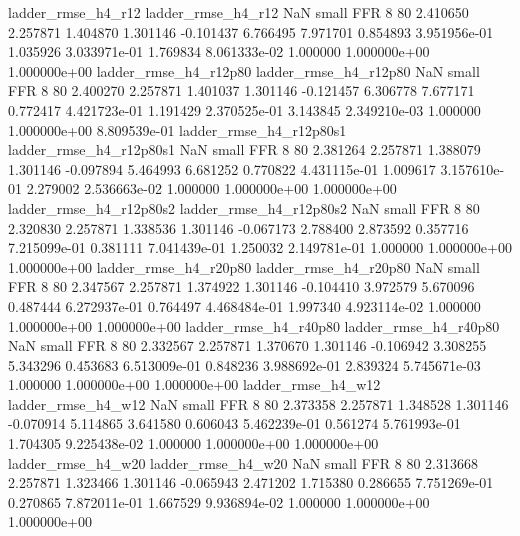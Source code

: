       ladder_rmse_h4_r12       ladder_rmse_h4_r12                   NaN      small      FFR                 8 80 2.410650       2.257871 1.404870       1.301146   -0.101437      6.766495      7.971701     0.854893   3.951956e-01  1.035926 3.033971e-01     1.769834   8.061333e-02            1.000000    1.000000e+00        1.000000e+00
   ladder_rmse_h4_r12p80    ladder_rmse_h4_r12p80                   NaN      small      FFR                 8 80 2.400270       2.257871 1.401037       1.301146   -0.121457      6.306778      7.677171     0.772417   4.421723e-01  1.191429 2.370525e-01     3.143845   2.349210e-03            1.000000    1.000000e+00        8.809539e-01
 ladder_rmse_h4_r12p80s1  ladder_rmse_h4_r12p80s1                   NaN      small      FFR                 8 80 2.381264       2.257871 1.388079       1.301146   -0.097894      5.464993      6.681252     0.770822   4.431115e-01  1.009617 3.157610e-01     2.279002   2.536663e-02            1.000000    1.000000e+00        1.000000e+00
 ladder_rmse_h4_r12p80s2  ladder_rmse_h4_r12p80s2                   NaN      small      FFR                 8 80 2.320830       2.257871 1.338536       1.301146   -0.067173      2.788400      2.873592     0.357716   7.215099e-01  0.381111 7.041439e-01     1.250032   2.149781e-01            1.000000    1.000000e+00        1.000000e+00
   ladder_rmse_h4_r20p80    ladder_rmse_h4_r20p80                   NaN      small      FFR                 8 80 2.347567       2.257871 1.374922       1.301146   -0.104410      3.972579      5.670096     0.487444   6.272937e-01  0.764497 4.468484e-01     1.997340   4.923114e-02            1.000000    1.000000e+00        1.000000e+00
   ladder_rmse_h4_r40p80    ladder_rmse_h4_r40p80                   NaN      small      FFR                 8 80 2.332567       2.257871 1.370670       1.301146   -0.106942      3.308255      5.343296     0.453683   6.513009e-01  0.848236 3.988692e-01     2.839324   5.745671e-03            1.000000    1.000000e+00        1.000000e+00
      ladder_rmse_h4_w12       ladder_rmse_h4_w12                   NaN      small      FFR                 8 80 2.373358       2.257871 1.348528       1.301146   -0.070914      5.114865      3.641580     0.606043   5.462239e-01  0.561274 5.761993e-01     1.704305   9.225438e-02            1.000000    1.000000e+00        1.000000e+00
      ladder_rmse_h4_w20       ladder_rmse_h4_w20                   NaN      small      FFR                 8 80 2.313668       2.257871 1.323466       1.301146   -0.065943      2.471202      1.715380     0.286655   7.751269e-01  0.270865 7.872011e-01     1.667529   9.936894e-02            1.000000    1.000000e+00        1.000000e+00
